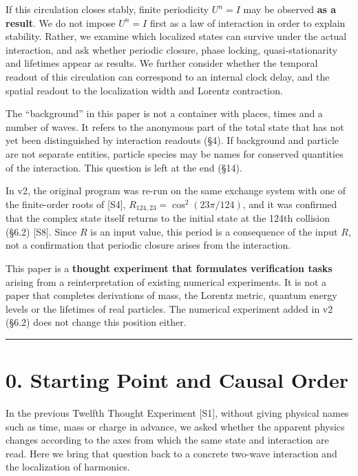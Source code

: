 \documentclass[
  a4paper,
]{article}
\begin{document}
If this circulation closes stably, finite periodicity \(U^n=I\) may be
observed \textbf{as a result}. We do not impose \(U^n=I\) first as a law
of interaction in order to explain stability. Rather, we examine which
localized states can survive under the actual interaction, and ask
whether periodic closure, phase locking, quasi-stationarity and
lifetimes appear as results. We further consider whether the temporal
readout of this circulation can correspond to an internal clock delay,
and the spatial readout to the localization width and Lorentz
contraction.

The ``background'' in this paper is not a container with places, times
and a number of waves. It refers to the anonymous part of the total
state that has not yet been distinguished by interaction readouts (§4).
If background and particle are not separate entities, particle species
may be names for conserved quantities of the interaction. This question
is left at the end (§14).

In v2, the original program was re-run on the same exchange system with
one of the finite-order roots of {[}S4{]},
\(R_{124,23}=\cos^2(23\pi/124)\), and it was confirmed that the complex
state itself returns to the initial state at the 124th collision (§6.2)
{[}S8{]}. Since \(R\) is an input value, this period is a consequence of
the input \(R\), not a confirmation that periodic closure arises from
the interaction.

This paper is a \textbf{thought experiment that formulates verification
tasks} arising from a reinterpretation of existing numerical
experiments. It is not a paper that completes derivations of mass, the
Lorentz metric, quantum energy levels or the lifetimes of real
particles. The numerical experiment added in v2 (§6.2) does not change
this position either.

\begin{center}\rule{0.5\linewidth}{0.5pt}\end{center}

\section{0. Starting Point and Causal
Order}\label{starting-point-and-causal-order}

In the previous Twelfth Thought Experiment {[}S1{]}, without giving
physical names such as time, mass or charge in advance, we asked whether
the apparent physics changes according to the axes from which the same
state and interaction are read. Here we bring that question back to a
concrete two-wave interaction and the localization of harmonics.
\end{document}
